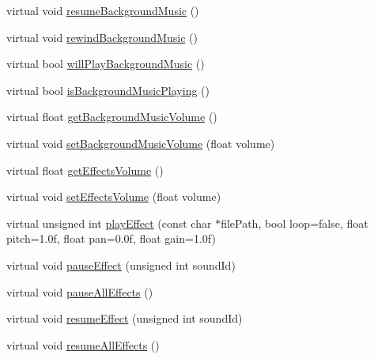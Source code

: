 \begin{DoxyCompactItemize}
\item 
virtual void \hyperlink{classCocosDenshion_1_1android_1_1AndroidJavaEngine_aa0bd22b0d6bafc1c6db7c57da0688d80}{resume\+Background\+Music} ()
\item 
virtual void \hyperlink{classCocosDenshion_1_1android_1_1AndroidJavaEngine_a65e37b788d03eff041fcb72754c2ed23}{rewind\+Background\+Music} ()
\item 
virtual bool \hyperlink{classCocosDenshion_1_1android_1_1AndroidJavaEngine_a3d3d6f0913b802f34598d4a89023a21f}{will\+Play\+Background\+Music} ()
\item 
virtual bool \hyperlink{classCocosDenshion_1_1android_1_1AndroidJavaEngine_ac709dfafca7cee544b93cf91c0cf3d2d}{is\+Background\+Music\+Playing} ()
\item 
virtual float \hyperlink{classCocosDenshion_1_1android_1_1AndroidJavaEngine_ae645138af1efe4007a90acd55fa55233}{get\+Background\+Music\+Volume} ()
\item 
virtual void \hyperlink{classCocosDenshion_1_1android_1_1AndroidJavaEngine_ac134271d2bfbc3bfa9b54eeb86f4f750}{set\+Background\+Music\+Volume} (float volume)
\item 
virtual float \hyperlink{classCocosDenshion_1_1android_1_1AndroidJavaEngine_aea7bc49b13e8823e9a64c9117d44fc09}{get\+Effects\+Volume} ()
\item 
virtual void \hyperlink{classCocosDenshion_1_1android_1_1AndroidJavaEngine_a45995fa6c9d77a9da8c2b389a9d938bd}{set\+Effects\+Volume} (float volume)
\item 
virtual unsigned int \hyperlink{classCocosDenshion_1_1android_1_1AndroidJavaEngine_a60468c945f19727c743ff7a0f9440d58}{play\+Effect} (const char $\ast$file\+Path, bool loop=false, float pitch=1.\+0f, float pan=0.\+0f, float gain=1.\+0f)
\item 
virtual void \hyperlink{classCocosDenshion_1_1android_1_1AndroidJavaEngine_ad6ad4348ecf5003e359ec7beb79475b6}{pause\+Effect} (unsigned int sound\+Id)
\item 
virtual void \hyperlink{classCocosDenshion_1_1android_1_1AndroidJavaEngine_ab7cd6dcfb8f652b064da4a2ae1edde63}{pause\+All\+Effects} ()
\item 
virtual void \hyperlink{classCocosDenshion_1_1android_1_1AndroidJavaEngine_a8c703b591bb1992c32915b375689dc39}{resume\+Effect} (unsigned int sound\+Id)
\item 
virtual void \hyperlink{classCocosDenshion_1_1android_1_1AndroidJavaEngine_a168aac306a10c8c272636cdd1d816760}{resume\+All\+Effects} ()
\item 

\end{DoxyCompactItemize}
